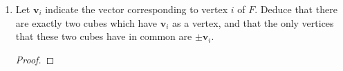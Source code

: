 \documentclass[../psets.tex]{subfiles}
\begin{document}
\begin{enumerate}
\begin{enumerate}
\begin{proof}
        \end{proof}
        \item Let $\mathbf{v}_i$ indicate the vector corresponding to vertex $i$ of $F$. Deduce that there are exactly two cubes which have $\mathbf{v}_i$ as a vertex, and that the only vertices that these two cubes have in common are $\pm\mathbf{v}_i$.
        \begin{proof}



\end{proof}
\end{enumerate}
\end{enumerate}
\end{document}
